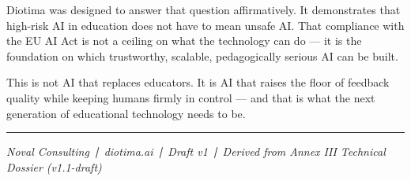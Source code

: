 \documentclass[11pt, a4paper]{article}
\begin{document}
Diotima was designed to answer that question affirmatively. It demonstrates that high-risk AI in education does not have to mean unsafe AI. That compliance with the EU AI Act is not a ceiling on what the technology can do --- it is the foundation on which trustworthy, scalable, pedagogically serious AI can be built.

This is not AI that replaces educators. It is AI that raises the floor of feedback quality while keeping humans firmly in control --- and that is what the next generation of educational technology needs to be.

\bigskip
{\color{teal}\rule{\textwidth}{0.6pt}}
\smallskip

{\small\color{mutedgrey}\textit{Noval Consulting\ \textbf{|}\ diotima.ai\ \textbf{|}\ Draft v1\ \textbf{|}\ Derived from Annex III Technical Dossier (v1.1-draft)}}
\end{document}
